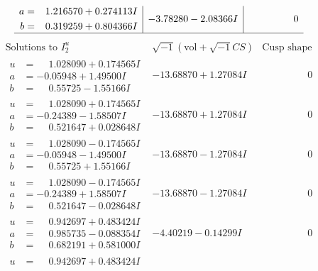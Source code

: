 \documentclass[1p]{elsarticle_modified}
\theoremstyle{definition}
\newcommand{\I}{\sqrt{-1}}
\begin{document}
$$\begin{array}{c|c|c}
\begin{aligned}
a &= \phantom{-}1.216570 + 0.274113 I \\
b &= \phantom{-}0.319259 + 0.804366 I\end{aligned}
 & -3.78280 - 2.08366 I & \phantom{-0.000000 } 0\\
 \hline 
 \end{array}$$\newpage$$\begin{array}{c|c|c}  
\text{Solutions to }I^u_{2}& \I (\text{vol} + \sqrt{-1}CS) & \text{Cusp shape}\\
 \hline 
\begin{aligned}
u &= \phantom{-}1.028090 + 0.174565 I \\
a &= -0.05948 + 1.49500 I \\
b &= \phantom{-}0.55725 - 1.55166 I\end{aligned}
 & -13.68870 + 1.27084 I & \phantom{-0.000000 } 0 \\ \hline\begin{aligned}
u &= \phantom{-}1.028090 + 0.174565 I \\
a &= -0.24389 - 1.58507 I \\
b &= \phantom{-}0.521647 + 0.028648 I\end{aligned}
 & -13.68870 + 1.27084 I & \phantom{-0.000000 } 0 \\ \hline\begin{aligned}
u &= \phantom{-}1.028090 - 0.174565 I \\
a &= -0.05948 - 1.49500 I \\
b &= \phantom{-}0.55725 + 1.55166 I\end{aligned}
 & -13.68870 - 1.27084 I & \phantom{-0.000000 } 0 \\ \hline\begin{aligned}
u &= \phantom{-}1.028090 - 0.174565 I \\
a &= -0.24389 + 1.58507 I \\
b &= \phantom{-}0.521647 - 0.028648 I\end{aligned}
 & -13.68870 - 1.27084 I & \phantom{-0.000000 } 0 \\ \hline\begin{aligned}
u &= \phantom{-}0.942697 + 0.483424 I \\
a &= \phantom{-}0.985735 - 0.088354 I \\
b &= \phantom{-}0.682191 + 0.581000 I\end{aligned}
 & -4.40219 - 0.14299 I & \phantom{-0.000000 } 0 \\ \hline\begin{aligned}
u &= \phantom{-}0.942697 + 0.483424 I \\

\end{aligned}
\end{array}$$
\end{document}
